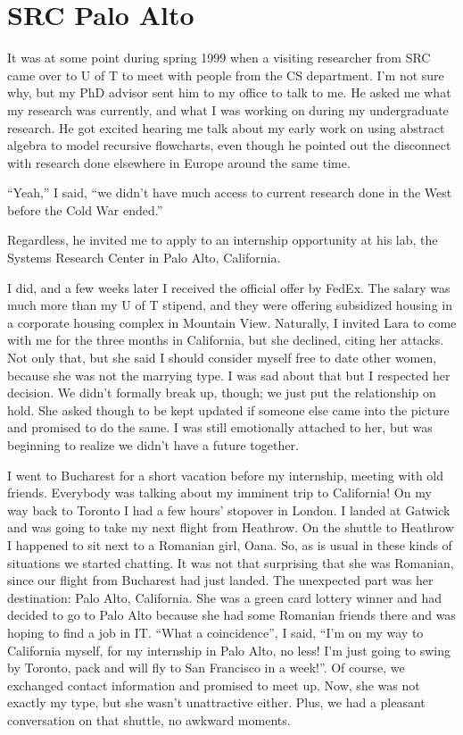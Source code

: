 \documentclass[12pt]{book}
\begin{document}
\section{SRC Palo Alto}

It was at some point during spring 1999 when a visiting researcher from
SRC came over to U of T to meet with people from the CS department. I'm
not sure why, but my PhD advisor sent him to my office to talk to me. He
asked me what my research was currently, and what I was working on
during my undergraduate research. He got excited hearing me talk about
my early work on using abstract algebra to model recursive flowcharts,
even though he pointed out the disconnect with research done elsewhere
in Europe around the same time.

``Yeah,'' I said, ``we didn't have much access to current research done
in the West before the Cold War ended.''

Regardless, he invited me to apply to an internship opportunity at his
lab, the Systems Research Center in Palo Alto, California.

I did, and a few weeks later I received the official offer by FedEx. The
salary was much more than my U of T stipend, and they were offering
subsidized housing in a corporate housing complex in Mountain View.
Naturally, I invited Lara to come with me for the three months in
California, but she declined, citing her attacks. Not only that, but she
said I should consider myself free to date other women, because she was
not the marrying type. I was sad about that but I respected her
decision. We didn't formally break up, though; we just put the
relationship on hold. She asked though to be kept updated if someone
else came into the picture and promised to do the same. I was still
emotionally attached to her, but was beginning to realize we didn't have
a future together.

I went to Bucharest for a short vacation before my internship, meeting
with old friends. Everybody was talking about my imminent trip to
California! On my way back to Toronto I had a few hours' stopover in
London. I landed at Gatwick and was going to take my next flight from
Heathrow. On the shuttle to Heathrow I happened to sit next to a
Romanian girl, Oana. So, as is usual in these kinds of situations we
started chatting. It was not that surprising that she was Romanian,
since our flight from Bucharest had just landed. The unexpected part was
her destination: Palo Alto, California. She was a green card lottery
winner and had decided to go to Palo Alto because she had some Romanian
friends there and was hoping to find a job in IT. ``What a
coincidence'', I said, ``I'm on my way to California myself, for my
internship in Palo Alto, no less! I'm just going to swing by Toronto,
pack and will fly to San Francisco in a week!''. Of course, we exchanged
contact information and promised to meet up. Now, she was not exactly my
type, but she wasn't unattractive either. Plus, we had a pleasant
conversation on that shuttle, no awkward moments.
\end{document}
